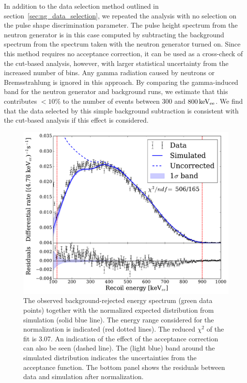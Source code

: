 In addition to the data selection method outlined in section~\ref{sec:ng_data_selection}, we repeated the analysis with no selection on the pulse shape discrimination parameter. The pulse height spectrum from the neutron generator is in this case computed by subtracting the background spectrum from the spectrum taken with the neutron generator turned on. Since this method requires no acceptance correction, it can be used as a cross-check of the cut-based analysis, however, with larger statistical uncertainty from the increased number of bins. Any gamma radiation caused by neutrons or Bremsstrahlung is ignored in this approach. By comparing the gamma-induced band for the neutron generator and background runs, we estimate that this contributes $<10$\% to the number of events between $300$ and $800\,\mathrm{keV_{ee}}$. We find that the data selected by this simple background subtraction is consistent with the cut-based analysis if this effect is considered. %

\begin{figure}[!htb]
\centering
    \includegraphics[width=\linewidth]{figures/ng/fit_with_acc_r}
    \caption{The observed background-rejected energy spectrum (green data points) together with the normalized expected distribution from simulation (solid blue line). The energy range considered for the normalization is indicated (red dotted lines). The reduced $\chi^2$ of the fit is 3.07. An indication of the effect of the acceptance correction can also be seen (dashed line). The (light blue) band around the simulated distribution indicates the uncertainties from the acceptance function. The bottom panel shows the residuals between data and simulation after normalization. }\label{fig:fit_with_acc}
\end{figure}

